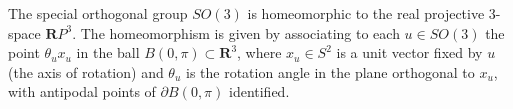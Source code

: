 The special orthogonal group $SO(3)$ is homeomorphic to the real projective 3-space $\mathbf{R}P^3$. The homeomorphism is given by associating to each $u \in SO(3)$ the point $\theta_u x_u$ in the ball $B(0, \pi) \subset \mathbf{R}^3$, where $x_u \in S^2$ is a unit vector fixed by $u$ (the axis of rotation) and $\theta_u$ is the rotation angle in the plane orthogonal to $x_u$, with antipodal points of $\partial B(0, \pi)$ identified.

